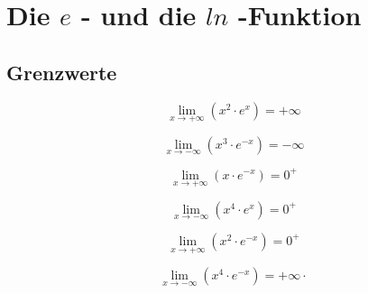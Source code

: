 \documentclass{ajc}
\numberwithin{equation}{subsection}
\begin{document}
	\section{Die $e$ - und die $ln$ -Funktion}
	\subsection{Grenzwerte}
	$$\lim_{x \to + \infty}\left(x^2 \cdot e^x\right) = +\infty$$
	
	$$\lim_{x \to - \infty}\left(x^3 \cdot e^{-x}\right) = -\infty$$
	
	$$\lim_{x \to + \infty}\left(x \cdot e^{-x}\right) = 0^+$$
	
	$$\lim_{x \to - \infty}\left(x^4 \cdot e^x\right) = 0^+$$
	
	$$\lim_{x \to + \infty}\left(x^2 \cdot e^{-x}\right) = 0^+$$
	
	$$\lim_{x \to - \infty}\left(x^4 \cdot e^{-x}\right) = +\infty·$$
	
\end{document}
